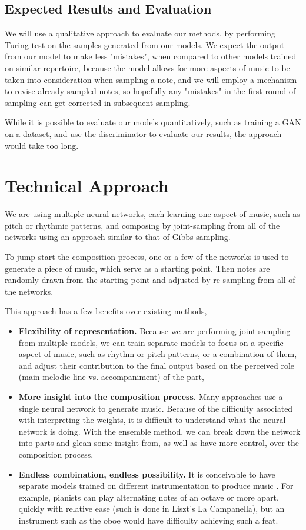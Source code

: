 \documentclass[10pt,twocolumn,letterpaper]{article}
\begin{document}
  \subsection{Expected Results and Evaluation}
  We will use a qualitative approach to evaluate our methods, by performing Turing test on the samples generated from our models. We expect the output from our model to make less "mistakes", when compared to other models trained on similar repertoire, because the model allows for more aspects of music to be taken into consideration when sampling a note, and we will employ a mechanism to revise already sampled notes, so hopefully any "mistakes" in the first round of sampling can get corrected in subsequent sampling.

  While it is possible to evaluate our models quantitatively, such as training a GAN on a dataset, and use the discriminator to evaluate our results, the approach would take too long.

  \section{Technical Approach}
  We are using multiple neural networks, each learning one aspect of music, such as pitch or rhythmic patterns, and composing by joint-sampling from all of the networks using an approach similar to that of Gibbs sampling.

  To jump start the composition process, one or a few of the networks is used to generate a piece of music, which serve as a starting point. Then notes are randomly drawn from the starting point and adjusted by re-sampling from all of the networks.

  \vspace{4mm}
  This approach has a few benefits over existing methods,
  \begin{itemize}
    \item \textbf{Flexibility of representation.} Because we are performing joint-sampling from multiple models, we can train separate models to focus on a specific aspect of music, such as rhythm or pitch patterns, or a combination of them, and adjust their contribution to the final output based on the perceived role (main melodic line vs. accompaniment) of the part,
    \item \textbf{More insight into the composition process.} Many approaches use a single neural network to generate music. Because of the difficulty associated with interpreting the weights, it is difficult to understand what the neural network is doing. With the ensemble method, we can break down the network into parts and glean some insight from, as well as have more control, over the composition process,
    \item \textbf{Endless combination, endless possibility.} It is conceivable to have separate models trained on different instrumentation to produce music . For example, pianists can play alternating notes of an octave or more apart, quickly with relative ease (such is done in Liszt's La Campanella), but an instrument such as the oboe would have difficulty achieving such a feat.
  \end{itemize}
\end{document}
